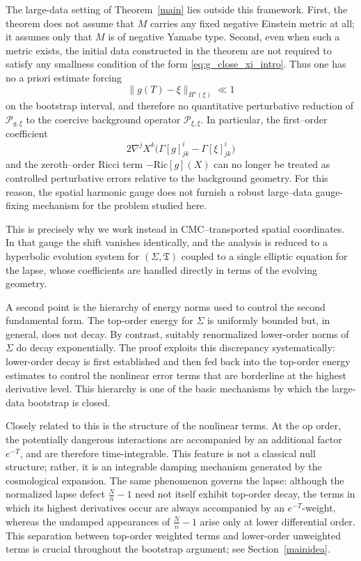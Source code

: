 \documentclass{amsart}
\begin{document}
\noindent The large-data setting of Theorem~\ref{main} lies outside this framework.  First, the
theorem does not assume that \(M\) carries any fixed negative Einstein metric at all; it
assumes only that \(M\) is of negative Yamabe type.  Second, even when such a metric
exists, the initial data constructed in the theorem are not required to satisfy any
smallness condition of the form \eqref{eq:g_close_xi_intro}.  Thus one has no a priori
estimate forcing
\[
\|g(T)-\xi\|_{H^{s}(\xi)}\ll1
\]
on the bootstrap interval, and therefore no quantitative perturbative reduction of
\(\mathcal P_{g,\xi}\) to the coercive background operator \(\mathcal P_{\xi,\xi}\).  In
particular, the first--order coefficient
\[
2\nabla^{j}X^{k}\bigl(\Gamma[g]^{i}_{jk}-\Gamma[\xi]^{i}_{jk}\bigr)
\]
and the zeroth--order Ricci term \(-\text{Ric}[g](X)\) can no longer be treated as controlled
perturbative errors relative to the background geometry.  For this reason, the spatial
harmonic gauge does not furnish a robust large--data gauge-fixing mechanism for the
problem studied here.

\noindent This is precisely why we work instead in CMC--transported spatial coordinates.  In that
gauge the shift vanishes identically, and the analysis is reduced to a hyperbolic evolution
system for \((\Sigma,\mathfrak T)\) coupled to a single elliptic equation for the lapse,
whose coefficients are handled directly in terms of the evolving geometry.
\medskip

\noindent A second point is the hierarchy of energy norms used to control the second fundamental form.  The top-order energy for \(\Sigma\) is uniformly bounded but, in general, does not decay.  By contrast, suitably renormalized lower-order norms of \(\Sigma\) do decay exponentially.  The proof exploits this discrepancy systematically: lower-order decay is first established and then fed back into the top-order energy estimates to control the nonlinear error terms that are borderline at the highest derivative level.  This hierarchy is one of the basic mechanisms by which the large-data bootstrap is closed.

\noindent Closely related to this is the structure of the nonlinear terms.  At the op order, the potentially dangerous interactions are accompanied by an additional factor \(e^{-T}\), and are therefore time-integrable.  This feature is not a classical null structure; rather, it is an integrable damping mechanism generated by the cosmological expansion.  The same phenomenon governs the lapse: although the normalized lapse defect \(\frac{N}{n}-1\) need not itself exhibit top-order decay, the terms in which its highest derivatives occur are always accompanied by an \(e^{-T}\)-weight, whereas the undamped appearances of \(\frac{N}{n}-1\) arise only at lower differential order.  This separation between top-order weighted terms and lower-order unweighted terms is crucial throughout the bootstrap argument; see Section~\ref{mainidea}.
\end{document}
